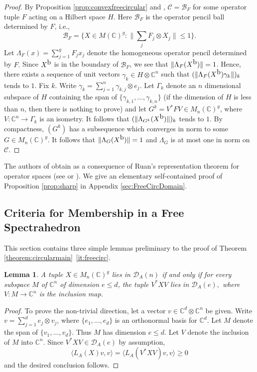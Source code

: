\documentclass[12pt,makeidx]{amsart}
\newtheorem{lemma}[theorem]{Lemma}
\numberwithin{equation}{section}
\def\cD{ {{\mathcal D}}}
\def\bbF{ {\mathbb C}}
\def\C{ {\mathbb{C}} }
\def\cC{ {\mathcal C} }
\def\cD{ {\mathcal D} }
\def\oX{X^{\mbox{\rm{b}}}}
\begin{document}
\begin{proof}
By Proposition \ref{prop:convexfreecircular} and  \cite[Proposition 3.5]{BVM},
 $\cC = \mathcal B_F$ for some operator tuple $F$ acting on a Hilbert space $H$.   Here $\mathcal B_F$ is the operator pencil ball determined by $F$, i.e.,
\[
\mathcal B_F = \Big\{X\in M(\C)^g : \big\|\sum_j F_j\otimes X_j\big\|\leq1\Big\}.
\]
Let $\Lambda_F(x)=\sum_{j=1}^g F_j x_j$ denote the homogeneous operator pencil determined by $F.$
 Since $\oX$ is in the boundary of $\mathcal B_F$, we see that $\|\Lambda_F(\oX)\|=1$. Hence, there exists a sequence of unit vectors $\gamma_k \in H \otimes\C^n$ such that $(\|\Lambda_F(\oX)\gamma_k\|)_k$ tends to $1$. Fix $k$. Write $\gamma_k = \sum_{j=1}^n \gamma_{k,j}\otimes e_j$. Let $\Gamma_k$ denote an $n$ dimensional subspace of $H$ containing the span of $\{\gamma_{k,1},\dots,\gamma_{k,n}\}$ (if the dimension of $H$ is less than $n$, then there is nothing to prove) and let $G^k= V^* FV\in M_n(\C)^g$, where $V:\C^n\to \Gamma_k$ is   an isometry. It follows that $(\|\Lambda_{G^k}(\oX)\|)_k$ tends to $1$. By compactness, $(G^k)$ has a subsequence which converges in norm to some $G\in M_n(\C)^g$. It follows that $\|\Lambda_{G}(\oX)\|=1$ and $\Lambda_{G}$ is at most one in norm on $\cC$.
\end{proof}


The authors of \cite{BVM} obtain \cite[Proposition 3.5]{BVM}  as a consequence of Ruan's 
representation theorem for operator spaces (see \cite[Theorem 2.3.5]{ER} or \cite[Chapter 13]{Pau}). 
We give an elementary self-contained proof of
Proposition \ref{prop:sharp} in Appendix \ref{sec:FreeCircDomain}.

\subsection{Criteria for Membership in a Free Spectrahedron}
This section contains three simple lemmas preliminary to the proof
 of Theorem \ref{theorem:circularmain}~\ref{it:freecirc}.


\begin{lemma}
 \label{lem:incDA}
 A tuple $X\in M_n(\bbF)^g$ lies in $\cD_A(n)$ if and only if for every subspace $M$ of $\mathbb C^n$ of dimension $e\le d$, the tuple $V^*XV$ lies in $\cD_A(e),$ where $V:M\to \mathbb C^n$ is the inclusion map. 
\end{lemma}

\begin{proof}
 To prove the non-trivial direction,  let a vector $v \in\mathbb C^d\otimes \mathbb C^n$ be given. Write  $v=\sum_{j=1}^d e_j\otimes v_j$, where $\{e_1,\dots,e_d\}$ is an orthonormal basis for $\mathbb C^d$. Let $M$ denote the span of $\{v_1,\dots,v_d\}$. Thus $M$ has dimension $e\le d$.  Let $V$ denote the inclusion of $M$ into $\mathbb C^n$.  Since $V^*XV\in \cD_A(e)$ by assumption, 
\[
  \langle L_A(X) v,v\rangle = \langle L_A(V^*XV)v,v\rangle \ge 0
\]
and the desired conclusion follows. 
\end{proof}
\end{document}
